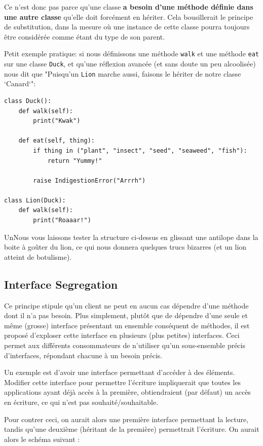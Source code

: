 \documentclass[11pt]{amsbook}
\begin{document}
Ce n’est donc pas parce qu’une classe \textbf{a besoin d’une méthode définie dans une autre classe} qu’elle doit forcément en hériter.
Cela bousillerait le principe de substitution, dans la mesure où une instance de cette classe pourra toujours être considérée comme étant du type de son parent.


Petit exemple pratique: si nous définissons une méthode \texttt{walk} et une méthode \texttt{eat} sur une classe \texttt{Duck}, et qu’une réflexion avancée (et sans doute un peu alcoolisée) nous dit que "Puisqu’un \texttt{Lion} marche aussi, faisons le hériter de notre classe `Canard`":


\begin{verbatim}
class Duck():
    def walk(self):
        print("Kwak")

    def eat(self, thing):
        if thing in ("plant", "insect", "seed", "seaweed", "fish"):
            return "Yummy!"

        raise IndigestionError("Arrrh")

class Lion(Duck):
    def walk(self):
        print("Roaaar!")
\end{verbatim}

UnNous vous laissons tester la structure ci-dessus en glissant une antilope dans la boite à goûter du lion, ce qui nous donnera quelques trucs bizarres (et un lion atteint de botulisme).


\hypertarget{x-interface-segregation}{\subsection{Interface Segregation}}
Ce principe stipule qu’un client ne peut en aucun cas dépendre d’une méthode dont il n’a pas besoin.
Plus simplement, plutôt que de dépendre d’une seule et même (grosse) interface présentant un ensemble conséquent de méthodes, il est proposé d’exploser cette interface en plusieurs (plus petites) interfaces.
Ceci permet aux différents consommateurs de n’utiliser qu’un sous-ensemble précis d’interfaces, répondant chacune à un besoin précis.


Un exemple est d’avoir une interface permettant d’accéder à des éléments.
Modifier cette interface pour permettre l’écriture impliquerait que toutes les applications ayant déjà accès à la première, obtiendraient (par défaut) un accès en écriture, ce qui n’est pas souhaité/souhaitable.


Pour contrer ceci, on aurait alors une première interface permettant la lecture, tandis qu’une deuxième (héritant de la première) permettrait l’écriture. On aurait alors le schéma suivant :
\end{document}
